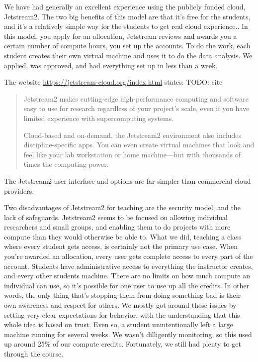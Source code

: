 \documentclass[12pt]{article}
\begin{document}
We have had generally an excellent experience using the publicly funded cloud, Jetstream2.
The two big benefits of this model are that it's free for the students, and it's a relatively simple way for the students to get real cloud experience..
In this model, you apply for an allocation, Jetstream reviews and awards you a certain number of compute hours, you set up the accounts.
To do the work, each student creates their own virtual machine and uses it to do the data analysis.
We applied, was approved, and had everything set up in less than a week.

The website \url{https://jetstream-cloud.org/index.html} states:
TODO: cite

\begin{quote}
Jetstream2 makes cutting-edge high-performance computing and software easy to use for research regardless of your project’s scale, even if you have limited experience with supercomputing systems.

Cloud-based and on-demand, the Jetstream2 environment also includes discipline-specific apps. You can even create virtual machines that look and feel like your lab workstation or home machine—but with thousands of times the computing power.
\end{quote}

The Jetstream2 user interface and options are far simpler than commercial cloud providers.

Two disadvantages of Jetstream2 for teaching are the security model, and the lack of safeguards.
Jetstream2 seems to be focused on allowing individual researchers and small groups, and enabling them to do projects with more compute than they would otherwise be able to.
What we did, teaching a class where every student gets access, is certainly not the primary use case.
When you're awarded an allocation, every user gets complete access to every part of the account.
Students have administrative access to everything the instructor creates, and every other students machine.
There are no limits on how much compute an individual can use, so it's possible for one user to use up all the credits.
In other words, the only thing that's stopping them from doing something bad is their own awareness and respect for others.
We mostly got around these issues by setting very clear expectations for behavior, with the understanding that this whole idea is based on trust.
Even so, a student unintentionally left a large machine running for several weeks.
We wasn't dilligently monitoring, so this used up around 25\% of our compute credits.
Fortunately, we still had plenty to get through the course.
\end{document}

